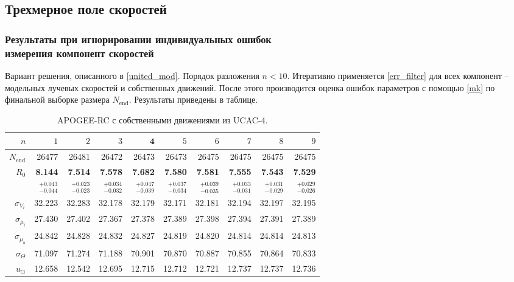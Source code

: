 \documentclass{matmex-diploma-custom}
\begin{document}
\pagebreak
\subsection{Трехмерное поле скоростей}
\subsubsection{Результаты при игнорировании индивидуальных ошибок \\ измерения компонент скоростей}
Вариант решения, описанного в \ref{united_mod}. Порядок разложения $n < 10$. Итеративно применяется \ref{err_filter} для всех компонент -- модельных лучевых скоростей и собственных движений. После этого производится оценка ошибок параметров с помощью \ref{mk} по финальной выборке размера $N_{\mathrm{end}}$. Результаты приведены в таблице. 
\begin{table}[h!!]
\centering
\caption{APOGEE-RC с собственными движениями из UCAC-4.}
\begin{tabular}{r|rr|rrr|rrrr}
\hline
$n$ & $1$ & $2$ & $3$ & $\textbf{4}$ & $5$&$ 6 $&$ 7 $&$ 8 $&$ 9 $\\\hline
 $N_{\mathrm{end}}$ & 26477       &    26481 &    26472 &    26473 &    26473 &    26475 &    26475 &    26475 &    26475 \\
 $R_0 $&  \textbf{8.144}       &   \textbf{ 7.514} &    \textbf{7.578} &    \textbf{7.682} &  \textbf{   7.580} &  \textbf{  7.581} &  \textbf{  7.555} &  \textbf{  7.543} &  \textbf{  7.529} \\
       & $_{-0.044}^{+0.043} $ & $_{-0.023}^{+0.023}$ & $_{-0.032}^{+0.034}$   & $_{-0.039}^{+0.047}$  & $_{-0.034}^{+0.037}$  & $_{-0.035}^{+0.039}$  & $_{-0.031}^{+0.033}$  & $_{-0.029}^{+0.031}$  & $_{-0.026}^{+0.029}$  \\\hline
 $\sigma_{V_r} $& 32.223      &  32.283 &  32.178 &  32.179 &  32.171 &  32.181 &  32.194 &  32.197 &  32.195  \\ 
 $\sigma_{\mu_l} $& 27.430      &  27.402 &  27.367 &  27.378 &  27.389 &  27.398 &  27.394 &  27.391 &  27.389  \\
 $\sigma_{\mu_b} $& 24.842      &  24.828 &  24.832 &  24.827 &  24.819 &  24.820 &  24.814 &  24.814 &  24.813  \\\hline 
 $\sigma_{\Theta} $& 71.097      &  71.274 &  71.188 &  70.901 &  70.870 &  70.887 &  70.855 &  70.864 &  70.833  \\\hline 
 $ u_{\odot} $& 12.658      &   12.542 &   12.695 &   12.715 &   12.712 &   12.721 &   12.737 &   12.737 &   12.736 \\

\end{tabular}
\end{table}
\end{document}
